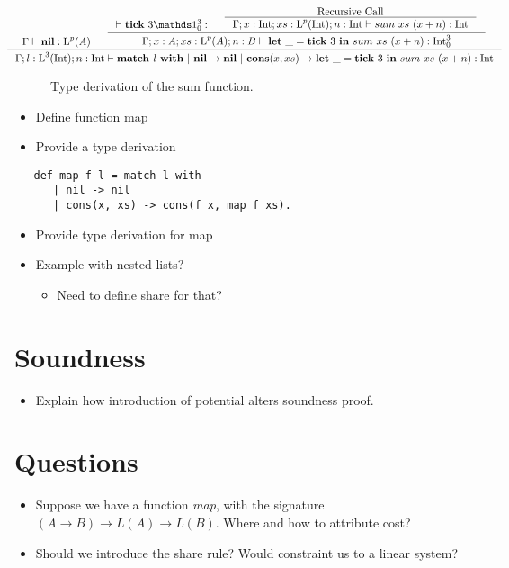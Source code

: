 \begin{figure}[H]
\begin{center}
   \[
      \hspace*{-1.5cm}
      \inference
      {
         \typing{\Gamma}{\listnil}{\ralist{p}{A}}
         &
         \inference
         {
            \typing{}{\tick{3}{\ratype{\unit}{3}{0}}}
            &
            \inference
            {
               \text{Recursive Call}
            }
            {
               \typing
               {\Gamma;x:\typeint;xs:\ralist{p}{\typeint};n:\typeint}
               {sum~xs~(x+n)}
               {\typeint}
            }
         }
         {
            \typing
            {\Gamma;x:A;xs:\ralist{p}{A};n:B}
            {\letexp{\_}{\tick{3}}{sum~xs~(x+n)}}
            {\ratype{\typeint}{3}{0}}
         }
      }
      {
         \typing
         {\Gamma;l:\ralist{3}{\typeint};n:\typeint}
         {\listmatch{l}{\listnil}{\letexp{\_}{\tick{3}}{sum~xs~(x+n)}}}
         {\typeint}
      }
   \]
   \end{center}
   \caption{Type derivation of the sum function.}
   \label{fig:type-derivation-sum}
\end{figure}














\begin{itemize}
   \item Define function map
   \item Provide a type derivation
\end{itemize}

\begin{verbatim}
   def map f l = match l with 
      | nil -> nil
      | cons(x, xs) -> cons(f x, map f xs).
\end{verbatim}

\begin{itemize}
   \item Provide type derivation for map
   \item Example with nested lists?
      \begin{itemize}
         \item Need to define share for that?
      \end{itemize}
\end{itemize}

\section{Soundness}
\begin{itemize}
   \item Explain how introduction of potential alters soundness proof.
\end{itemize}

\section{Questions}

\begin{itemize}
   \item Suppose we have a function \emph{map}, with the signature \((A \to B) \to L(A) \to L(B)\). Where and how to attribute cost?
   \item Should we introduce the share rule? Would constraint us to a linear system?
\end{itemize}

